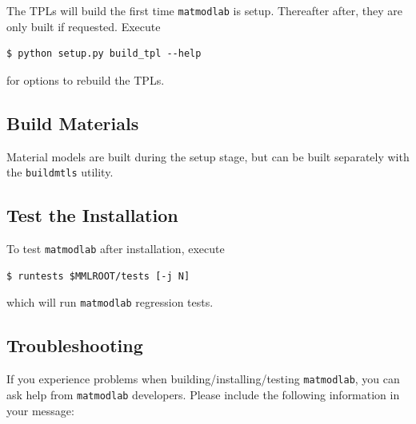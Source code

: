 \documentclass[12pt,report,strict]{SANDreport/SANDreport}
\newcommand{\mml}{\texttt{matmodlab}}
\newcommand{\bldm}{\texttt{buildmtls}}
\begin{document}
The TPLs will build the first time \mml{} is setup.
Thereafter after, they are only built if requested.  Execute

\begin{verbatim}
$ python setup.py build_tpl --help
\end{verbatim}
for options to rebuild the TPLs.

\subsection{Build Materials}
\label{sec:bld}
Material models are built during the setup stage, but can be built separately
with the \bldm{} utility.

\subsection{Test the Installation}
\label{sec:test-install}
To test \mml{} after installation, execute

\begin{verbatim}
$ runtests $MMLROOT/tests [-j N]
\end{verbatim}
%
which will run \mml{} regression tests.

\subsection{Troubleshooting}
\label{sec:trouble}
If you experience problems when building/installing/testing \mml{}, you can
ask help from \mml{} developers. Please include the following information
in your message:
\end{document}
